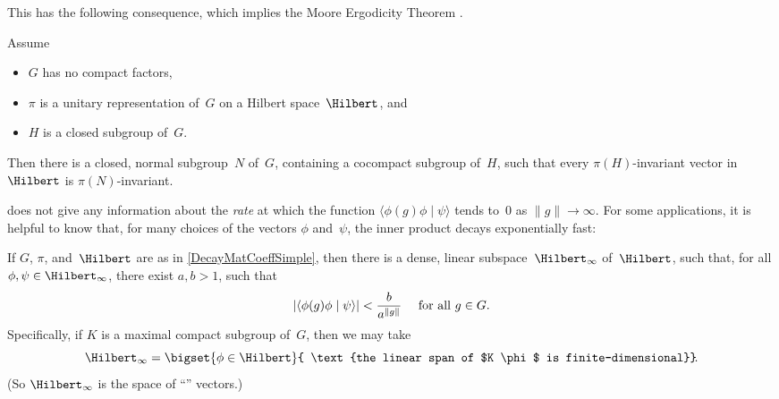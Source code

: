 This has the following consequence, which implies the {Moore Ergodicity Theorem} .

\begin{cor} \label{MautnerPhenom}
 Assume
 \begin{itemize}
 \item $G$ has no compact factors,
 \item $\pi$ is a unitary representation of~$G$ on a Hilbert space~$\Hilbert$, and
 \item $H$ is a closed subgroup of~$G$.
 \end{itemize}
 Then there is a closed, normal subgroup~$N$ of~$G$, containing a cocompact
subgroup of~$H$, such that every $\pi(H)$-invariant vector in~$\Hilbert$ is
$\pi(N)$-invariant.
 \end{cor}
 
 \begin{rem} \label{QuantitativeDecay}
  does not give any information about the \emph{rate} at which the function $\langle \phi(g) \phi \mid \psi \rangle$ tends to~$0$ as $\|g\| \to \infty$. For some applications, it is helpful to know that, for many choices of the vectors $\phi$ and~$\psi$, the inner product decays exponentially fast:

 	If $G$, $\pi$, and~$\Hilbert$ are as in \cref{DecayMatCoeffSimple}, then there is a dense, linear subspace~$\Hilbert_\infty$ of~$\Hilbert$, such that, for all $\phi , \psi \in \Hilbert_\infty$, there exist $a,b > 1$, such that 
		$$ \text{$\displaystyle |\langle \phi(g) \phi \mid \psi \rangle| < \frac{b}{a^{\|g\|}}$ \quad for all $g \in G$} . $$
Specifically, if $K$ is a maximal compact subgroup of~$G$, then we may take
	$$\Hilbert_\infty = \bigset{ \phi \in \Hilbert }{  \text{the linear span of $K \phi$ is finite-dimensional}} \! .$$
(So $\Hilbert_\infty$ is the space of ``'' vectors.)
 \end{rem}
 
